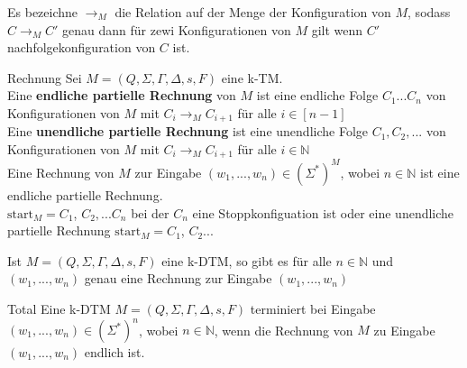 
Es bezeichne $\rightarrow_M$ die Relation auf der Menge der Konfiguration von $M$, 
sodass $C \rightarrow_M C'$ genau dann für zewi Konfigurationen von $M$ gilt wenn $C'$ nachfolgekonfiguration von $C$ ist. 

\begin{defn}{Rechnung}
    Sei $M = (Q, \Sigma, \Gamma, \Delta, s, F)$ eine k-TM. \\
    
    Eine \textbf{endliche partielle Rechnung} von $M$ ist eine endliche Folge
    $C_1...C_n$ von Konfigurationen von $M$ mit $C_i \rightarrow_M C_{i+1}$ für alle $i \in [n-1]$ \\

    Eine \textbf{unendliche partielle Rechnung} ist eine unendliche Folge $C_1,C_2,...$ von Konfigurationen von $M$
    mit $C_i \rightarrow_M C_{i+1}$ für alle $i \in \mathbb{N}$ \\

    Eine Rechnung von $M$ zur Eingabe $(w_1,...,w_n) \in (\Sigma^*)^M$, wobei $n \in \mathbb{N}$ ist eine endliche partielle Rechnung. \\
    $\text{start}_M = C_1$, $C_2,...C_n$ bei der $C_n$ eine Stoppkonfiguation ist oder eine unendliche partielle Rechnung $\text{start}_M = C_1$, $C_2...$ 
\end{defn}

\begin{bem}
    Ist $M = (Q, \Sigma, \Gamma, \Delta, s, F)$ eine k-DTM, so gibt es für alle $n \in \mathbb{N}$ und $(w_1,...,w_n)$
    genau eine Rechnung zur Eingabe $(w_1,...,w_n)$
\end{bem}

\begin{defn}{Total}
    Eine k-DTM $M = (Q, \Sigma, \Gamma, \Delta, s, F)$ terminiert bei Eingabe $(w_1,...,w_n) \in (\Sigma^*)^n$,
    wobei $n \in \mathbb{N}$, wenn die Rechnung von $M$ zu Eingabe $(w_1,...,w_n)$ endlich ist.
\end{defn}
